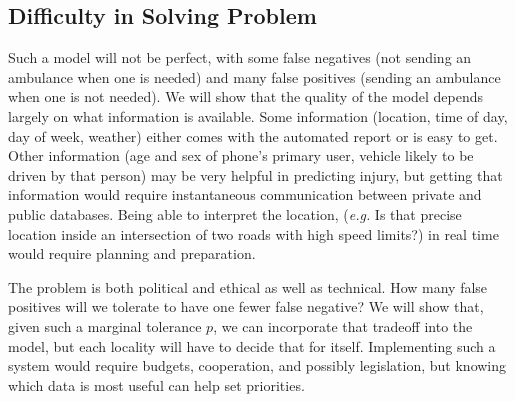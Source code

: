 \subsection{Difficulty in Solving Problem}

Such a model will not be perfect, with some false negatives (not sending an ambulance when one is needed) and many false positives (sending an ambulance when one is not needed).  We will show that the quality of the model depends largely on what information is available.  Some information (location, time of day, day of week, weather) either comes with the automated report or is easy to get.  Other information (age and sex of phone's primary user, vehicle likely to be driven by that person) may be very helpful in predicting injury, but getting that information would require instantaneous communication between private and public databases.  Being able to interpret the location, ({\it e.g.} Is that precise location inside an intersection of two roads with high speed limits?) in real time would require planning and preparation.  

The problem is both political and ethical as well as technical.  How many false positives will we tolerate to have one fewer false negative?  We will show that, given such a marginal tolerance $p$, we can incorporate that tradeoff into the model, but each locality will have to decide that for itself.  Implementing such a system would require budgets, cooperation, and possibly legislation, but knowing which data is most useful can help set priorities.  


